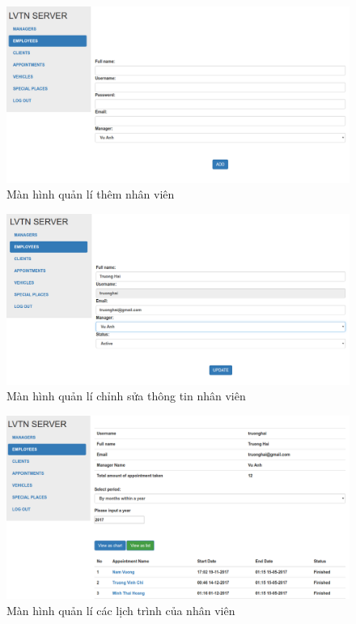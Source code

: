 \documentclass[a4paper]{article}
\begin{document}
\begin{figure}[H]
\centering
\includegraphics[scale=0.5]{admin/admin_themnhanvien}
\caption{Màn hình quản lí thêm nhân viên}
\end{figure}

\begin{figure}[H]
\centering
\includegraphics[scale=0.5]{admin/admin_chinhsuanhanvien}
\caption{Màn hình quản lí chỉnh sửa thông tin nhân viên}
\end{figure}

\begin{figure}[H]
\centering
\includegraphics[scale=0.5]{admin/admin_lichtrinh}
\caption{Màn hình quản lí các lịch trình của nhân viên}
\end{figure}
\end{document}
